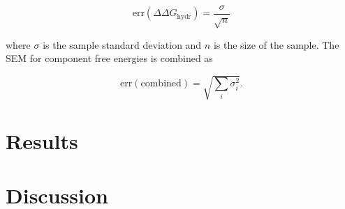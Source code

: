 \documentclass[journal=jctcce,manuscript=article]{achemso}
\begin{document}
\begin{equation}
  \label{eq:sem}
  \mathrm{err}(\Delta\Delta G_{\mathrm{hydr}}) = \frac{\sigma}{\sqrt{n}}
\end{equation}

where $\sigma$ is the sample standard deviation and $n$ is the size of
the sample.  The SEM for component free energies is combined as

\begin{equation}
  \label{eq:sem-comb}
  \mathrm{err}(\mathrm{combined}) = \sqrt{\sum_i \sigma_i^2}.
\end{equation}

\section{Results}
\label{sec:results}


\section{Discussion}
\label{sec:discuss}


\end{document}
